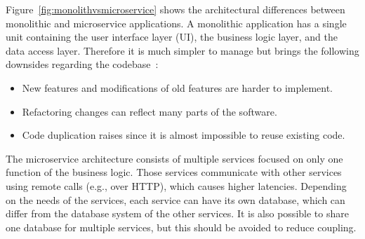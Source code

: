 Figure~\ref{fig:monolithvsmicroservice} shows the architectural differences between monolithic and microservice applications.
A monolithic application has a single unit containing the user interface layer (UI), the business logic layer, and the data access layer.
Therefore it is much simpler to manage but brings the following downsides regarding the codebase~\cite{kalske2017challenges}:
\begin{itemize}
    \item New features and modifications of old features are harder to implement.
    \item Refactoring changes can reflect many parts of the software.
    \item Code duplication raises since it is almost impossible to reuse existing code.
\end{itemize}
The microservice architecture consists of multiple services focused on only one function of the business logic.
Those services communicate with other services using remote calls (e.g., over HTTP), which causes higher latencies.
Depending on the needs of the services, each service can have its own database, which can differ from the database system of the other services.
It is also possible to share one database for multiple services, but this should be avoided to reduce coupling. 

